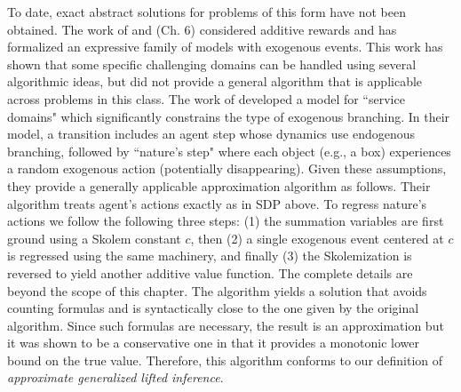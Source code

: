 To date, exact abstract solutions for problems of this form have not been obtained.
The work of \cite{sanner:icaps07}
and 
\cite{Sanner08} (Ch. 6) considered additive rewards and
has formalized an expressive family of models with exogenous events. This work 
has
shown that some specific challenging domains can be handled using several algorithmic ideas, but did not provide a general algorithm that is applicable across problems in this class. 
The work of \cite{JoshiKhRaTaFe13} 
developed a model for ``service domains" which significantly constrains the type of exogenous branching. In their model, a transition includes an agent step whose dynamics use endogenous branching, followed by ``nature's step" where each object (e.g., a box) experiences a random exogenous action (potentially disappearing). 
Given these assumptions, they provide a generally applicable approximation algorithm as follows.
%
Their algorithm treats agent's actions exactly as in SDP above. To regress nature's actions we follow the following three steps: (1) the summation variables
are first ground using a Skolem constant $c$, then (2) a single exogenous event centered at $c$ is regressed using the same machinery, and finally (3) the Skolemization is reversed to yield another additive value function. 
The complete details are beyond the scope of this chapter.
%
The algorithm yields a solution that avoids counting formulas and is syntactically close to the one given by the original algorithm. Since such formulas are necessary, the result is an approximation but it was shown to be a conservative one in that it provides a monotonic lower bound on the true value. 
Therefore, this algorithm
conforms to our definition of {\em approximate generalized lifted inference}. 


